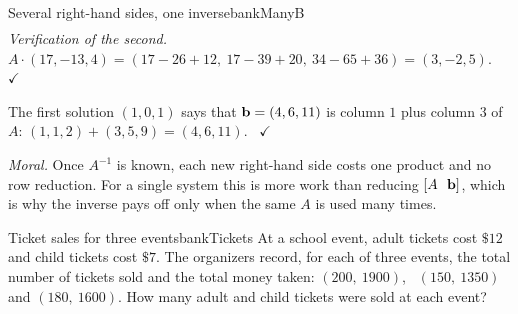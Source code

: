 \documentclass[11pt]{article}
\begin{document}
\begin{exmp}{Several right-hand sides, one inverse}{bankManyB}
\begin{align*}
\end{align*}
\emph{Verification of the second.} $A\cdot(17,-13,4)=(17-26+12,\ 17-39+20,\ 34-65+36)=(3,-2,5)$. \ $\checkmark$

The first solution $(1,0,1)$ says that $\mathbf{b}=(4,6,11)$ is column $1$ plus column $3$ of $A$: $(1,1,2)+(3,5,9)=(4,6,11)$. \ $\checkmark$

\emph{Moral.} Once $A^{-1}$ is known, each new right-hand side costs one product and no row reduction. For a single system this is more work than reducing $[A\ \ \mathbf{b}]$, which is why the inverse pays off only when the same $A$ is used many times.
\end{exmp}

\begin{exmp}{Ticket sales for three events}{bankTickets}
At a school event, adult tickets cost $\$12$ and child tickets cost $\$7$. The organizers record, for each of three events, the total number of tickets sold and the total money taken: $(200,\ 1900)$, \ $(150,\ 1350)$ and $(180,\ 1600)$. How many adult and child tickets were sold at each event?


\end{exmp}
\end{document}
